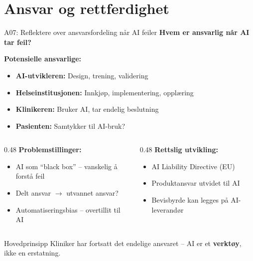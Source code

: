 \documentclass[aspectratio=169, 10pt]{beamer}
\begin{document}
\section{Ansvar og rettferdighet}

\begin{frame}{A07: Reflektere over ansvarsfordeling når AI feiler}
    \textbf{Hvem er ansvarlig når AI tar feil?}
    
    \vspace{0.3cm}
    \textbf{Potensielle ansvarlige:}
    \begin{itemize}
        \item \textbf{AI-utvikleren:} Design, trening, validering
        \item \textbf{Helseinstitusjonen:} Innkjøp, implementering, opplæring
        \item \textbf{Klinikeren:} Bruker AI, tar endelig beslutning
        \item \textbf{Pasienten:} Samtykker til AI-bruk?
    \end{itemize}
    
    \vspace{0.3cm}
    \begin{columns}[T]
        \begin{column}{0.48\textwidth}
            \textbf{Problemstillinger:}
            \begin{itemize}
                \item AI som ``black box'' -- vanskelig å forstå feil
                \item Delt ansvar $\rightarrow$ utvannet ansvar?
                \item Automatiseringsbias -- overtillit til AI
            \end{itemize}
        \end{column}
        \begin{column}{0.48\textwidth}
            \textbf{Rettslig utvikling:}
            \begin{itemize}
                \item AI Liability Directive (EU)
                \item Produktansvar utvidet til AI
                \item Bevisbyrde kan legges på AI-leverandør
            \end{itemize}
        \end{column}
    \end{columns}
    
    \begin{block}{Hovedprinsipp}
        Kliniker har fortsatt det endelige ansvaret -- AI er et \textbf{verktøy}, ikke en erstatning.
    \end{block}
\end{frame}
\end{document}
